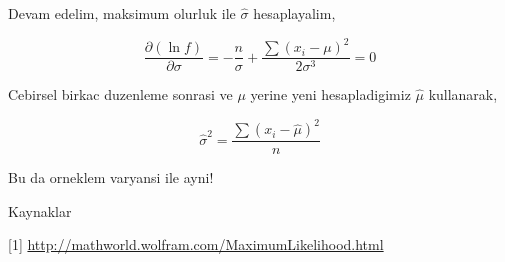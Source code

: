 \documentclass[12pt,fleqn]{article}\usepackage{../common}
\begin{document}
Devam edelim, maksimum olurluk ile $\hat{\sigma}$ hesaplayalim,

$$ \frac{\partial (\ln f)}{\partial \sigma} =
-\frac{n}{\sigma} + \frac{\sum (x_i-\mu)^2}{2\sigma^3}   = 0 
$$

Cebirsel birkac duzenleme sonrasi ve $\mu$ yerine yeni hesapladigimiz
$\hat{\mu}$ kullanarak,

$$ \hat{\sigma}^2 = \frac{\sum (x_i-\hat{\mu})^2}{n} $$

Bu da orneklem varyansi ile ayni! 

Kaynaklar

[1] \url{http://mathworld.wolfram.com/MaximumLikelihood.html}
\end{document}
